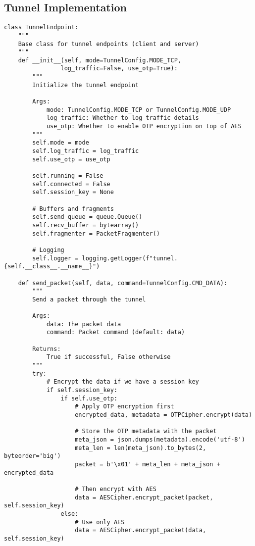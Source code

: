 \documentclass[12pt,a4paper]{report}
\begin{document}
\subsection{Tunnel Implementation}
\begin{lstlisting}[style=python, caption=Tunnel Implementation]
class TunnelEndpoint:
    """
    Base class for tunnel endpoints (client and server)
    """
    def __init__(self, mode=TunnelConfig.MODE_TCP, 
                log_traffic=False, use_otp=True):
        """
        Initialize the tunnel endpoint
        
        Args:
            mode: TunnelConfig.MODE_TCP or TunnelConfig.MODE_UDP
            log_traffic: Whether to log traffic details
            use_otp: Whether to enable OTP encryption on top of AES
        """
        self.mode = mode
        self.log_traffic = log_traffic
        self.use_otp = use_otp
        
        self.running = False
        self.connected = False
        self.session_key = None
        
        # Buffers and fragments
        self.send_queue = queue.Queue()
        self.recv_buffer = bytearray()
        self.fragmenter = PacketFragmenter()
        
        # Logging
        self.logger = logging.getLogger(f"tunnel.{self.__class__.__name__}")
        
    def send_packet(self, data, command=TunnelConfig.CMD_DATA):
        """
        Send a packet through the tunnel
        
        Args:
            data: The packet data
            command: Packet command (default: data)
            
        Returns:
            True if successful, False otherwise
        """
        try:
            # Encrypt the data if we have a session key
            if self.session_key:
                if self.use_otp:
                    # Apply OTP encryption first
                    encrypted_data, metadata = OTPCipher.encrypt(data)
                    
                    # Store the OTP metadata with the packet
                    meta_json = json.dumps(metadata).encode('utf-8')
                    meta_len = len(meta_json).to_bytes(2, byteorder='big')
                    packet = b'\x01' + meta_len + meta_json + encrypted_data
                    
                    # Then encrypt with AES
                    data = AESCipher.encrypt_packet(packet, self.session_key)
                else:
                    # Use only AES
                    data = AESCipher.encrypt_packet(data, self.session_key)
            

\end{lstlisting}
\end{document}
